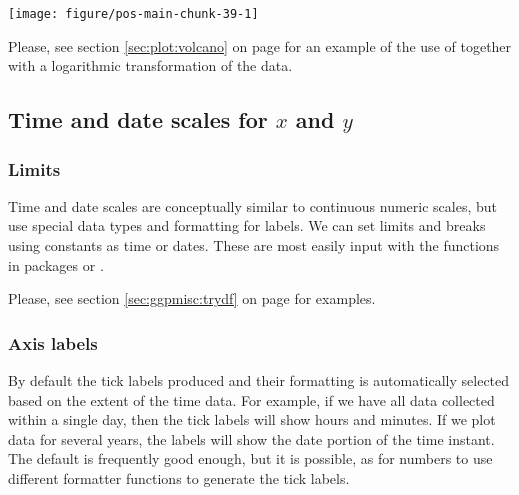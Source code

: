 \documentclass[krantz2]{krantz}\usepackage{knitr}%
\begin{document}
\begin{knitrout}\footnotesize
{}\color{fgcolor}\begin{kframe}
\begin{alltt}
  \hlopt{+}
  \hlstd{()} \hlopt{+}
  \hlstd{(} \hlopt{::}\hlstd{())}
\end{alltt}
\end{kframe}

{\centering \texttt{[image: figure/pos-main-chunk-39-1]} 

}



\end{knitrout}

\sloppy
Please, see section \ref{sec:plot:volcano} on page \pageref{sec:plot:volcano} for an example of the use of  together with a logarithmic transformation of the data.

\subsection{Time and date scales for $x$ and $y$}

\subsubsection{Limits}

Time and date scales are conceptually similar to continuous numeric scales, but use special data types and formatting for labels. We can set limits and breaks using constants as time or dates. These are most easily input with the functions in packages  or .

Please, see section \ref{sec:ggpmisc:trydf} on page \pageref{sec:ggpmisc:trydf} for examples.

\subsubsection{Axis labels}

By default the tick labels produced and their formatting is automatically selected based on the extent of the time data. For example, if we have all data collected within a single day, then the tick labels will show hours and minutes. If we plot data for several years, the labels will show the date portion of the time instant. The default is frequently good enough, but it is possible, as for numbers to use different formatter functions to generate the tick labels.
\end{document}
